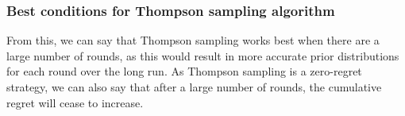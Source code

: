 \subsubsection{Best conditions for Thompson sampling algorithm}
From this, we can say that Thompson sampling works best when there are a large number of rounds, as this would result in more accurate prior distributions for each round over the long run.
As Thompson sampling is a zero-regret strategy, we can also say that after a large number of rounds, the cumulative regret will cease to increase.

